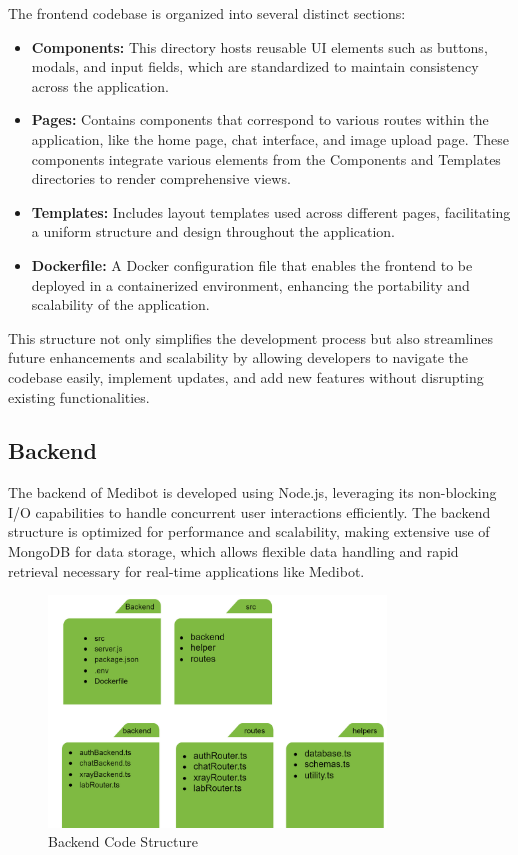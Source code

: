 The frontend codebase is organized into several distinct sections:
\begin{itemize}
    \item \textbf{Components:} This directory hosts reusable UI elements such as buttons, modals, and input fields, which are standardized to maintain consistency across the application.
    \item \textbf{Pages:} Contains components that correspond to various routes within the application, like the home page, chat interface, and image upload page. These components integrate various elements from the Components and Templates directories to render comprehensive views.
    \item \textbf{Templates:} Includes layout templates used across different pages, facilitating a uniform structure and design throughout the application.
    \item \textbf{Dockerfile:} A Docker configuration file that enables the frontend to be deployed in a containerized environment, enhancing the portability and scalability of the application.
\end{itemize}

This structure not only simplifies the development process but also streamlines future enhancements and scalability by allowing developers to navigate the codebase easily, implement updates, and add new features without disrupting existing functionalities.


\subsection{Backend}
The backend of Medibot is developed using Node.js, leveraging its non-blocking I/O capabilities to handle concurrent user interactions efficiently. The backend structure is optimized for performance and scalability, making extensive use of MongoDB for data storage, which allows flexible data handling and rapid retrieval necessary for real-time applications like Medibot.

\begin{figure}[H]
    \centering
    \includegraphics[width=0.8\textwidth]{./Figures/BackendCodeStructure.png}
    \caption{Backend Code Structure}
    \label{fig:backend_code_structure}
\end{figure}

